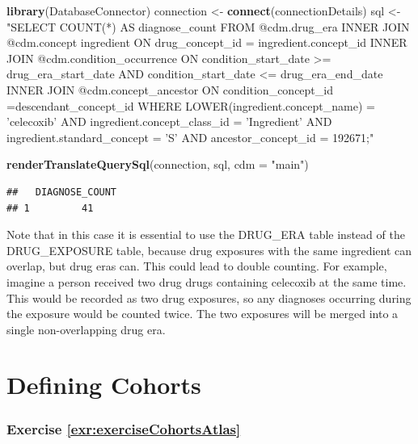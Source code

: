 \documentclass[11pt]{book}
\newenvironment{Shaded}{\begin{snugshade}}{\end{snugshade}}
\newcommand{\DataTypeTok}[1]{\textcolor[rgb]{0.13,0.29,0.53}{#1}}
\newcommand{\KeywordTok}[1]{\textcolor[rgb]{0.13,0.29,0.53}{\textbf{#1}}}
\newcommand{\NormalTok}[1]{#1}
\newcommand{\StringTok}[1]{\textcolor[rgb]{0.31,0.60,0.02}{#1}}
\theoremstyle{definition}
\theoremstyle{definition}
\theoremstyle{definition}
\theoremstyle{remark}
\begin{document}
\begin{Shaded}
\begin{Highlighting}[]
\KeywordTok{library}\NormalTok{(DatabaseConnector)}
\NormalTok{connection <-}\StringTok{ }\KeywordTok{connect}\NormalTok{(connectionDetails)}
\NormalTok{sql <-}\StringTok{ "SELECT COUNT(*) AS diagnose_count}
\StringTok{FROM @cdm.drug_era}
\StringTok{INNER JOIN @cdm.concept ingredient}
\StringTok{  ON drug_concept_id = ingredient.concept_id}
\StringTok{INNER JOIN @cdm.condition_occurrence}
\StringTok{  ON condition_start_date >= drug_era_start_date}
\StringTok{    AND condition_start_date <= drug_era_end_date}
\StringTok{INNER JOIN @cdm.concept_ancestor }
\StringTok{  ON condition_concept_id =descendant_concept_id}
\StringTok{WHERE LOWER(ingredient.concept_name) = 'celecoxib'}
\StringTok{  AND ingredient.concept_class_id = 'Ingredient'}
\StringTok{  AND ingredient.standard_concept = 'S'}
\StringTok{  AND ancestor_concept_id = 192671;"}

\KeywordTok{renderTranslateQuerySql}\NormalTok{(connection, sql, }\DataTypeTok{cdm =} \StringTok{"main"}\NormalTok{)}
\end{Highlighting}
\end{Shaded}

\begin{verbatim}
##   DIAGNOSE_COUNT
## 1         41
\end{verbatim}

Note that in this case it is essential to use the DRUG\_ERA table instead of the DRUG\_EXPOSURE table, because drug exposures with the same ingredient can overlap, but drug eras can. This could lead to double counting. For example, imagine a person received two drug drugs containing celecoxib at the same time. This would be recorded as two drug exposures, so any diagnoses occurring during the exposure would be counted twice. The two exposures will be merged into a single non-overlapping drug era.

\hypertarget{Cohortsanswers}{%
\section{Defining Cohorts}\label{Cohortsanswers}}

\hypertarget{exercise-refexrexercisecohortsatlas}{%
\subsubsection*{Exercise \ref{exr:exerciseCohortsAtlas}}\label{exercise-refexrexercisecohortsatlas}}
\end{document}
